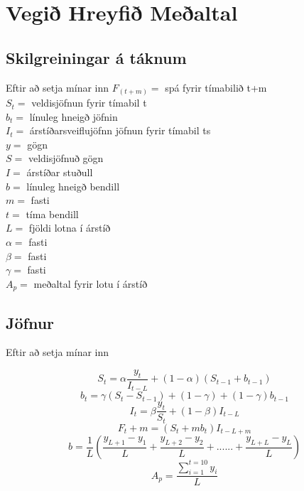 \section {Vegið Hreyfið Meðaltal}
 



\subsection{Skilgreiningar á táknum}

Eftir að setja mínar inn
	$F_(t+m)=$ spá fyrir tímabilið  t+m \\
	$S_t =$  veldisjöfnun fyrir tímabil t\\ 	
	$b_t =$ línuleg hneigð jöfnin \\
	$I_t =$ árstíðarsveiflujöfnn jöfnun fyrir tímabil ts \\
	$y =$ gögn\\
	$S =$ veldisjöfnuð gögn \\
	$I =$	árstíðar stuðull \\
	$b =$ línuleg hneigð bendill \\
	$m =$ fasti	\\
	$t =$ tíma bendill \\
	$L =$ fjöldi lotna í árstíð \\
	$\alpha =$ fasti \\
	$\beta =$ fasti \\
	$\gamma =$ fasti \\
	$A_p =$ meðaltal fyrir lotu í árstíð\\


\subsection{Jöfnur}
	
	Eftir að setja mínar inn

	$$S_t = \alpha\dfrac{y_t}{I_{t - L}} + (1-\alpha)(S_{t-1}+ b_{t-1} ) $$
	$$b_t = \gamma  (S_{t}-S_{t-1})+(1- \gamma) + (1 - \gamma)b_{t-1}$$
	$$I_t = \beta \dfrac{y_t}{S_t} +(1-\beta)I_{t-L} $$
	$$F_t+m = (S_{t} +mb_{t})I_{t-L+m}$$
	$$b= \dfrac{1}{L}(\dfrac{y_{L+1}-y_1}{L} + \dfrac{y_{L+2}-y_2}{L}+......+ \dfrac{y_{L+L}-y_L}{L} ) $$
	$$A_p = \dfrac{\sum_{i=1}^{t=10} y_i}{L} $$